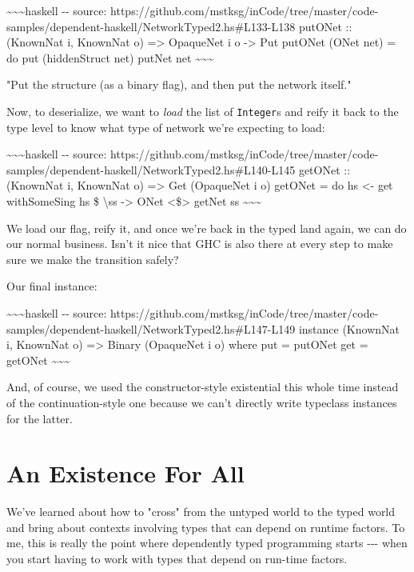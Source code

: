 \documentclass[]{article}
\begin{document}
\textasciitilde{}\textasciitilde{}\textasciitilde{}haskell -\/- source:
https://github.com/mstksg/inCode/tree/master/code-samples/dependent-haskell/NetworkTyped2.hs\#L133-L138
putONet :: (KnownNat i, KnownNat o) =\textgreater{} OpaqueNet i o
-\textgreater{} Put putONet (ONet net) = do put (hiddenStruct net) putNet net
\textasciitilde{}\textasciitilde{}\textasciitilde{}

"Put the structure (as a binary flag), and then put the network itself."

Now, to deserialize, we want to \emph{load} the list of \texttt{Integer}s and
reify it back to the type level to know what type of network we're expecting to
load:

\textasciitilde{}\textasciitilde{}\textasciitilde{}haskell -\/- source:
https://github.com/mstksg/inCode/tree/master/code-samples/dependent-haskell/NetworkTyped2.hs\#L140-L145
getONet :: (KnownNat i, KnownNat o) =\textgreater{} Get (OpaqueNet i o) getONet
= do hs \textless{}- get withSomeSing hs \$ \textbackslash{}ss -\textgreater{}
ONet \textless{}\$\textgreater{} getNet ss
\textasciitilde{}\textasciitilde{}\textasciitilde{}

We load our flag, reify it, and once we're back in the typed land again, we can
do our normal business. Isn't it nice that GHC is also there at every step to
make sure we make the transition safely?

Our final instance:

\textasciitilde{}\textasciitilde{}\textasciitilde{}haskell -\/- source:
https://github.com/mstksg/inCode/tree/master/code-samples/dependent-haskell/NetworkTyped2.hs\#L147-L149
instance (KnownNat i, KnownNat o) =\textgreater{} Binary (OpaqueNet i o) where
put = putONet get = getONet \textasciitilde{}\textasciitilde{}\textasciitilde{}

And, of course, we used the constructor-style existential this whole time
instead of the continuation-style one because we can't directly write typeclass
instances for the latter.

\section{An Existence For All}

We've learned about how to "cross" from the untyped world to the typed world and
bring about contexts involving types that can depend on runtime factors. To me,
this is really the point where dependently typed programming starts -\/-\/- when
you start having to work with types that depend on run-time factors.
\end{document}
